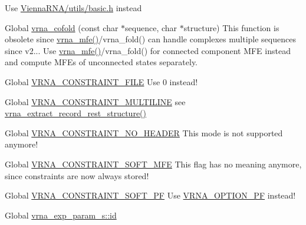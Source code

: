 \begin{DoxyRefList}
\label{deprecated__deprecated000141}%
%
Use \mbox{\hyperlink{utils_2basic_8h}{Vienna\+RNA/utils/basic.\+h}} instead  
\item[Global \mbox{\hyperlink{group__mfe__global_ga9ef3a297201dbf838a8daff2b45c0c82}{vrna\+\_\+cofold}} (const char $\ast$sequence, char $\ast$structure)]\label{deprecated__deprecated000090}%
%
This function is obsolete since \mbox{\hyperlink{group__mfe__global_gabd3b147371ccf25c577f88bbbaf159fd}{vrna\+\_\+mfe()}}/vrna\+\_\+fold() can handle complexes multiple sequences since v2... Use \mbox{\hyperlink{group__mfe__global_gabd3b147371ccf25c577f88bbbaf159fd}{vrna\+\_\+mfe()}}/vrna\+\_\+fold() for connected component MFE instead and compute MFEs of unconnected states separately. 
\item[Global \mbox{\hyperlink{group__constraints_ga62e0ed0c33002c09423de4e646f85a2b}{VRNA\+\_\+\+CONSTRAINT\+\_\+\+FILE}} ]\label{deprecated__deprecated000157}%
%
Use 0 instead!  
\item[Global \mbox{\hyperlink{group__file__formats_ga7d725ef525b29891abef3f1ed42599a4}{VRNA\+\_\+\+CONSTRAINT\+\_\+\+MULTILINE}} ]\label{deprecated__deprecated000164}%
%
see \mbox{\hyperlink{group__file__formats_gac788da233f9160b06c2e751afad8936c}{vrna\+\_\+extract\+\_\+record\+\_\+rest\+\_\+structure()}}  
\item[Global \mbox{\hyperlink{hard_8h_a08d12a9a846ea593b7171d277c9f033f}{VRNA\+\_\+\+CONSTRAINT\+\_\+\+NO\+\_\+\+HEADER}} ]\label{deprecated__deprecated000160}%
%
This mode is not supported anymore! 
\item[Global \mbox{\hyperlink{group__constraints_ga62aa195893d02d1a79ca94952748df36}{VRNA\+\_\+\+CONSTRAINT\+\_\+\+SOFT\+\_\+\+MFE}} ]\label{deprecated__deprecated000158}%
%
This flag has no meaning anymore, since constraints are now always stored!  
\item[Global \mbox{\hyperlink{group__constraints_ga03fb5000c19b9a2082bf4ea30a543045}{VRNA\+\_\+\+CONSTRAINT\+\_\+\+SOFT\+\_\+\+PF}} ]\label{deprecated__deprecated000159}%
%
Use \mbox{\hyperlink{group__fold__compound_gabfbadcddda3e74ce7f49035ef8f058f7}{VRNA\+\_\+\+OPTION\+\_\+\+PF}} instead!  
\item[Global \mbox{\hyperlink{group__energy__parameters_a378d5bcf2bae1f3ec84c912c7d3908d2}{vrna\+\_\+exp\+\_\+param\+\_\+s\+::id}} ]\label{deprecated__deprecated000152}%

\end{DoxyRefList}
